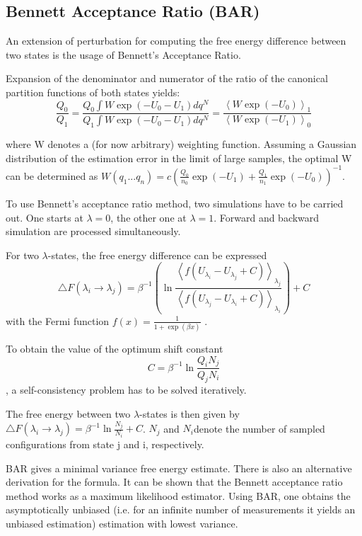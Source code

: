 \subsection{Bennett Acceptance Ratio (BAR)}

An extension of perturbation for computing the free energy difference between
two states is the usage of Bennett's Acceptance Ratio\cite{Bennett.1976}. 

Expansion of the denominator and numerator of the ratio of the canonical
partition functions of both states yields: 
\[
\frac{Q_{0}}{Q_{1}}=\frac{Q_{0}\int W\exp\left(-U_{0}-U_{1}\right)dq^{N}}{Q_{1}\int W\exp\left(-U_{0}-U_{1}\right)dq^{N}}=\frac{\left\langle W\exp\left(-U_{0}\right)\right\rangle _{1}}{\left\langle W\exp\left(-U_{1}\right)\right\rangle _{0}}
\]

where W denotes a (for now arbitrary) weighting function. Assuming
a Gaussian distribution of the estimation error in the limit of large
samples, the optimal W can be determined as $W\left(q_{1}...q_{n}\right)=c\left(\frac{Q_{0}}{n_{0}}\exp\left(-U_{1}\right)+\frac{Q_{1}}{n_{1}}\exp\left(-U_{0}\right)\right)^{-1}$\cite{Bennett.1976}. 

To use Bennett's acceptance ratio method, two simulations have
to be carried out. One starts at $\lambda=0$, the other one at $\lambda=1$.
Forward and backward simulation are processed simultaneously. 

For two $\lambda$-states, the free energy difference can be expressed
\[
\bigtriangleup F\left(\lambda_{i}\rightarrow\lambda_{j}\right)=\beta^{-1}\left(\ln\frac{\left\langle f\left(U_{\lambda_{i}}-U_{\lambda_{j}}+C\right)\right\rangle _{\lambda_{j}}}{\left\langle f\left(U_{\lambda_{j}}-U_{\lambda_{i}}+C\right)\right\rangle _{\lambda_{i}}}\right)+C
\]
with the Fermi function $f\left(x\right)=\frac{1}{1+\exp\left(\beta x\right)}$
\cite{Bruckner.2011}\cite{Gapsys.2015}.

To obtain the value of the optimum shift constant
\[
C=\beta^{-1}\ln\frac{Q_{i}N_{j}}{Q_{j}N_{i}}
\],
a self-consistency
problem has to be solved iteratively\cite{Gapsys.2015}.

The free energy between two $\lambda$-states is then given by $\bigtriangleup F\left(\lambda_{i}\rightarrow\lambda_{j}\right)=\beta^{-1}\ln\frac{N_{j}}{N_{i}}+C$\cite{Bruckner.2011}.
$N_{j}$ and $N_{i}$denote the number of sampled configurations from
state j and i, respectively.

BAR gives a minimal variance free energy estimate. There is also an
alternative derivation for the formula. It can be shown that the
Bennett acceptance ratio method works as a maximum likelihood estimator.
Using BAR, one obtains the asymptotically unbiased (i.e. for an infinite
number of measurements it yields an unbiased estimation) estimation
with lowest variance\cite{Shirts.2003}. 


